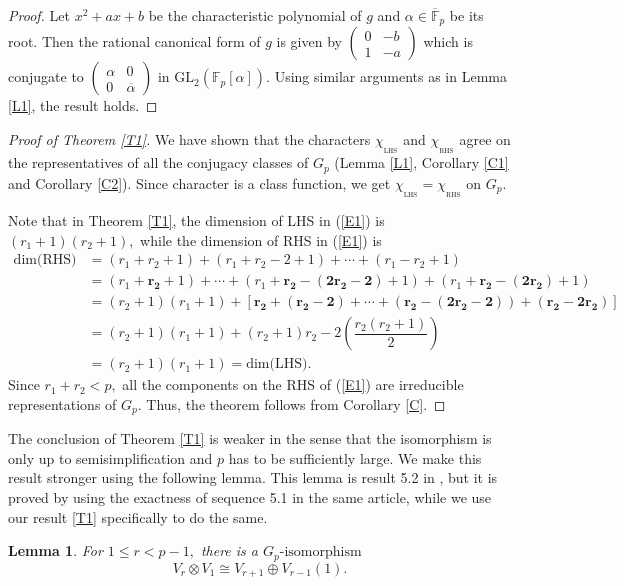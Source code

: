 \documentclass[10pt, reqno]{amsart}
\def\F{{\mathbb F}}
\def\Gp{{G_p}}
\def\CL{{\chi_{_{\mathrm{LHS}}}}}
\def\CR{{\chi_{_{\mathrm{RHS}}}}}
\numberwithin{equation}{section}
\newtheorem{lemma}[theorem]{Lemma}%
\theoremstyle{remark}
\begin{document}
	\begin{proof}
		Let $x^2+ax+b$ be the characteristic polynomial of $g$ and $\alpha\in\overline{\F}_p$ be its root. Then the rational canonical form of $g$ is given by $\left(
		\begin{matrix}
			0 & -b\\
			1 & -a
		\end{matrix}
		\right)$ which is conjugate to $\left(
		\begin{matrix}
			\alpha & 0\\
			0 & \overline\alpha
		\end{matrix}
		\right)\text{ in } \text{GL}_2(\F_p[\alpha]).$ Using similar arguments as in Lemma \ref{L1}, the result holds.
	\end{proof}
	\begin{proof}[Proof of Theorem \ref{T1}] We have shown that the characters $\CL$ and $\CR$ agree on the representatives of all the conjugacy classes of $\Gp$ (Lemma \ref{L1}, Corollary \ref{C1} and Corollary \ref{C2}). Since character is a class function, we get $\CL=\CR$ on $\Gp.$
		
		Note that in Theorem \ref{T1}, the dimension of LHS in (\ref{E1}) is $(r_1+1)(r_2+1),$ while the dimension of RHS in (\ref{E1}) is		
		\begin{align*}
			\text{dim(RHS)}&=(r_1+r_2+1)+(r_1+r_2-2+1)+\cdots+ (r_1-r_2+1)\\
			&=(r_1+\mathbf{r_2}+1)+\cdots+\left(r_1+\mathbf{r_2-(2r_2-2)}+1\right)+\left(r_1+\mathbf{r_2-(2r_2)}+1\right)\\
			&=(r_2+1)(r_1+1)+\left[\mathbf{r_2+(r_2-2)+\cdots+(r_2-(2r_2-2))+(r_2-2r_2)}\right]\\
			&=(r_2+1)(r_1+1)+(r_2+1)r_2-2\left(\dfrac{r_2(r_2+1)}{2}\right)\\
			&= (r_2+1)(r_1+1)= \text{dim(LHS)}.
		\end{align*}
		Since $r_1+r_2<p,$ all the components on the RHS of (\ref{E1}) are irreducible representations of $\Gp.$ Thus, the theorem follows from Corollary \ref{C}.
	\end{proof}
	
	
	The conclusion of Theorem \ref{T1} is weaker in the sense that the isomorphism is only up to semisimplification and $p$ has to be sufficiently large. We make this result stronger using the following lemma. This lemma is result 5.2 in \cite{DG}, but it is proved by using the exactness of sequence 5.1 in the same article, while we use our result \ref{T1} specifically to do the same.
	\begin{lemma}\label{L2}
		For $1\leq r< p-1,$  there is a $\Gp\text{-isomorphism}$ $$V_r\otimes V_1\cong V_{r+1}\oplus V_{r-1}(1).$$
	\end{lemma}
	
\end{document}
